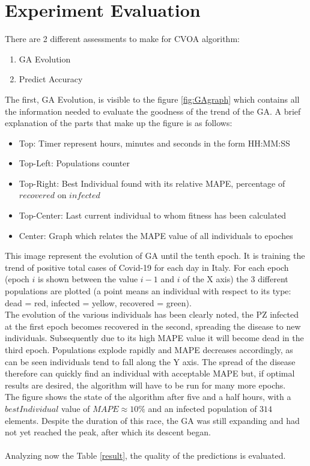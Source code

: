 \documentclass[letterpaper]{article}%
\begin{document}
\section{Experiment Evaluation}
There are 2 different assessments to make for CVOA algorithm:
\begin{enumerate}[label=\arabic*)]
\item GA Evolution
\item Predict Accuracy
\end{enumerate}
The first, GA Evolution, is visible to the figure \ref{fig:GAgraph} which contains all the information needed to evaluate the goodness of the trend of the GA. A brief explanation of the parts that make up the figure is as follows:
\begin{itemize}
\item Top: Timer represent hours, minutes and seconds in the form HH:MM:SS
\item Top-Left: Populations counter
\item Top-Right: Best Individual found with its relative MAPE, percentage of $recovered$ on $infected$
\item Top-Center: Last current individual to whom fitness has been calculated
\item Center: Graph which relates the MAPE value of all individuals to epoches 
\end{itemize}
This image represent the evolution of GA until the tenth epoch. It is training the trend of positive total cases of Covid-19 for each day in Italy. For each epoch (epoch $i$ is shown between the value $i-1$ and $i$ of the X axis) the 3 different populations are plotted (a point means an individual with respect to its type: dead = red, infected = yellow, recovered = green).\\
The evolution of the various individuals has been clearly noted, the PZ infected at the first epoch becomes recovered in the second, spreading the disease to new individuals. Subsequently due to its high MAPE value it will become dead in the third epoch.
Populations explode rapidly and MAPE decreases accordingly, as can be seen individuals tend to fall along the Y axis. The spread of the disease therefore can quickly find an individual with acceptable MAPE but, if optimal results are desired, the algorithm will have to be run for many more epochs. \\The figure shows the state of the algorithm after five and a half hours, with a $bestIndividual$ value of $MAPE \approx 10\%$ and an infected population of $314$ elements. Despite the duration of this race, the GA was still expanding and had not yet reached the peak, after which its descent began.\\
\\
Analyzing now the Table \ref{result}, the quality of the predictions is evaluated.
\end{document}
